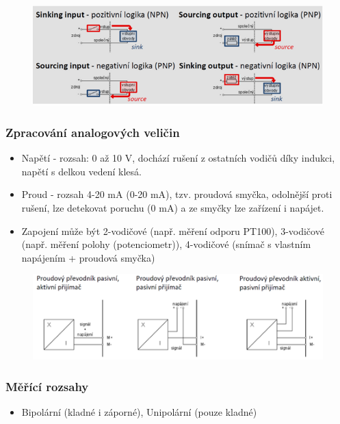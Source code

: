   \begin{figure}[h]
    \begin{center}
      \includegraphics[scale = 1]{img/picture5.png}
    \end{center}
  \end{figure}

  \subsubsection*{Zpracování analogových veličin}
  \begin{itemize}
    \item Napětí - rozsah: 0 až 10 V, dochází rušení z ostatních vodičů díky indukci, napětí s delkou vedení klesá.
    \item Proud - rozsah 4-20 mA (0-20 mA), tzv. proudová smyčka, odolnější proti rušení, lze detekovat poruchu (0 mA) a ze smyčky lze zařízení i napájet. 
    \item Zapojení může být 2-vodičové (např. měření odporu PT100), 3-vodičové (např. měření polohy (potenciometr)), 4-vodičové (snímač s vlastním napájením + proudová smyčka) 
  \end{itemize}
  
  \begin{figure}[h]
    \begin{center}
      \includegraphics[scale = 1]{img/picture4.png}
    \end{center}
  \end{figure}

  \subsubsection*{Měřící rozsahy}
  \begin{itemize}
    \item Bipolární (kladné i záporné), Unipolární (pouze kladné)
  \end{itemize}


